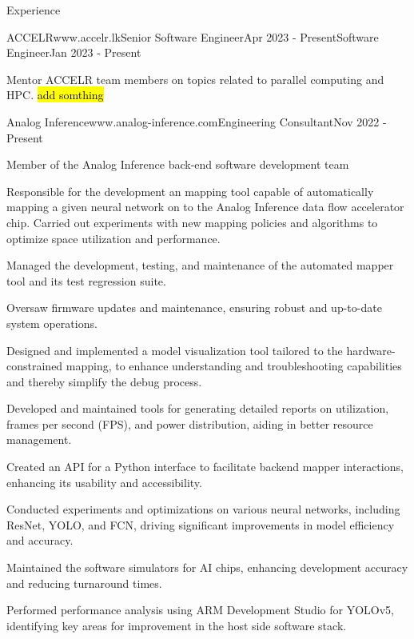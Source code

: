 \documentclass[
	11pt, %
]{./assets/resume} %
\begin{document}
\begin{rSection}{Experience}

	\begin{rSubsectionM}{ACCELR}{www.accelr.lk}{Senior Software Engineer}{Apr 2023 - Present}{Software Engineer}{Jan 2023 - Present}{}{}
        \item Mentor ACCELR team members on topics related to parallel computing and HPC. \hl{add somthing}
	\end{rSubsectionM}

	\begin{rSubsectionX}{Analog Inference}{www.analog-inference.com}{Engineering Consultant}{Nov 2022 - Present}
		\item Member of the Analog Inference back-end software development team
		\item Responsible for the development an mapping tool capable of automatically mapping a given neural network on to the Analog Inference data flow accelerator chip. Carried out experiments with new mapping policies and algorithms to optimize space utilization and performance.
		\item Managed the development, testing, and maintenance of the automated mapper tool and its test regression suite.
		\item Oversaw firmware updates and maintenance, ensuring robust and up-to-date system operations.
		\item Designed and implemented a model visualization tool tailored to the hardware-constrained mapping, to enhance understanding and troubleshooting capabilities and thereby simplify the debug process.
		\item Developed and maintained tools for generating detailed reports on utilization, frames per second (FPS), and power distribution, aiding in better resource management.
		\item Created an API for a Python interface to facilitate backend mapper interactions, enhancing its usability and accessibility.
		\item Conducted experiments and optimizations on various neural networks, including ResNet, YOLO, and FCN, driving significant improvements in model efficiency and accuracy.
		\item Maintained the software simulators for AI chips, enhancing development accuracy and reducing turnaround times.
		\item Performed performance analysis using ARM Development Studio for YOLOv5, identifying key areas for improvement in the host side software stack.
	\end{rSubsectionX}


\end{rSection}
\end{document}
